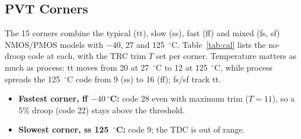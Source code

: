 \documentclass[conference]{IEEEtran}
\begin{document}
\subsection{PVT Corners}\label{sec:pvt}
The 15 corners combine the typical (tt), slow (ss), fast (ff) and mixed (fs, sf) NMOS/PMOS models with $-40$, 27 and 125~$^\circ$C. Table~\ref{tab:cal} lists the no-droop code at each, with the TRC trim $T$ set per corner. Temperature matters as much as process: tt moves from 20 at 27~$^\circ$C to 12 at 125~$^\circ$C, while process spreads the 125~$^\circ$C code from 9 (ss) to 16 (ff); fs/sf track tt.
\begin{itemize}
\item \textbf{Fastest corner, ff $-40~^\circ$C:} code 28 even with maximum trim ($T{=}11$), so a 5\% droop (code 22) stays above the threshold.
\item \textbf{Slowest corner, ss 125~$^\circ$C:} code 9; the TDC is out of range.
\end{itemize}
\end{document}
